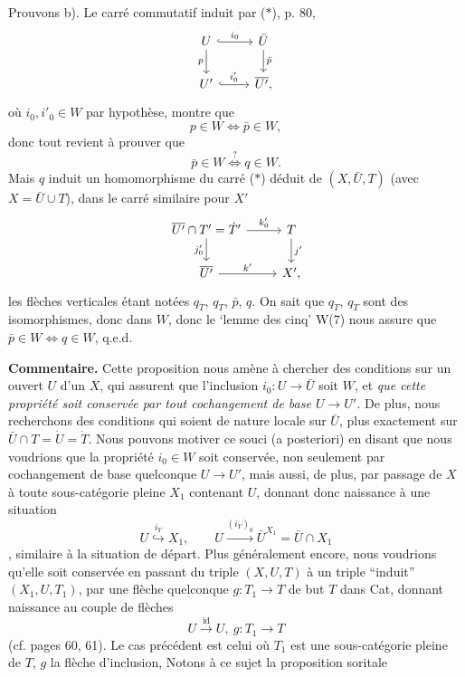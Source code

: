 Prouvons b). Le carré commutatif induit par ($*$), p. 80,
\[
\begin{tikzcd}
U \arrow[r, hook, "i_0"] \arrow[d, "p"'] & \bar U \arrow[d, "\bar p"] \\
U' \arrow[r, hook, "i'_0"] & \overline{U'},
\end{tikzcd}
\]
où $i_0,i'_0\in W$ par hypothèse, montre que
\[
p\in W\iff\bar p\in W,
\]
donc tout revient à prouver que
\[
\bar p\in W\overset{?}{\iff}q\in W.
\]
Mais $q$ induit un homomorphisme du carré ($*$) déduit de $(X,\bar U,T)$ (avec $X=\bar U\cup T$), dans le carré similaire pour $X'$
\[
\begin{tikzcd}
\overline{U'}\cap T'=\dot T' \arrow[r, "k'_0"] \arrow[d, "j'_0"'] & T \arrow[d, "j'"] \\ %
\overline{U'} \arrow[r, "k'"] & X',
\end{tikzcd}
\]
les flèches verticales étant notées $q_{\dot T}$, $q_T$, $\bar p$, $q$.
On sait que $q_{\dot T}$, $q_T$ sont des isomorphismes, donc dans $W$, donc le ‘lemme des cinq’ W(7) nous assure que $\bar p\in W\iff q\in W$, q.e.d.

\textbf{Commentaire.} Cette proposition nous amène à chercher des conditions sur un ouvert $U$ d’un $X$, qui assurent que l’inclusion $i_0:U\longrightarrow\bar U$ soit $W$, et \textit{que cette propriété soit conservée par tout cochangement de base $U\longrightarrow U'$.} De plus, nous recherchons des conditions qui soient de nature locale sur $\bar U$, plus exactement sur $\bar U\cap T=\dot U=\dot T$. Nous pouvons motiver ce souci (a posteriori) en disant que nous voudrions que la propriété $i_0\in W$ soit conservée, non seulement par cochangement de base quelconque $U\longrightarrow U'$, mais aussi, de plus, par passage de $X$ à toute sous-catégorie pleine $X_1$ contenant $U$, donnant donc naissance à une situation
\[
U\overset{i_Y}{\hookrightarrow}X_1,\qquad U\xrightarrow{(i_Y)_0}\bar U^{X_1}=\bar U\cap X_1
\]
, similaire à la situation de départ. Plus généralement encore, nous voudrions qu’elle soit conservée en passant du triple $(X,U,T)$ à un triple “induit” $(X_1,U,T_1)$, par une flèche quelconque $g:T_1\longrightarrow T$ de but $T$ dans Cat, donnant naissance au couple de flèches
\[
U\xrightarrow{\mathrm{id}}U,\ g:T_1\longrightarrow T
\]
(cf. pages 60, 61). Le cas précédent est celui où
$T_1$ est une sous-catégorie pleine de $T$, $g$ la flèche d’inclusion, Notons à ce sujet la proposition soritale %

